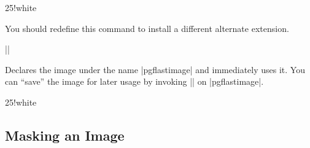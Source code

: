 \begin{command}{\pgfuseimage{}}
\begin{codeexample}[]
\begin{colormixin}{25!white}
\begin{pgfpicture}
  \pgfpathrectangle{\pgfpoint{1cm}{5cm}}{\pgfpoint{1cm}{1cm}}
  \pgfpathrectangle{\pgfpoint{1cm}{3cm}}{\pgfpoint{1cm}{1cm}}
  \pgfpathrectangle{\pgfpoint{1cm}{1cm}}{\pgfpoint{1cm}{1cm}}
\end{pgfpicture}
\end{colormixin}
\end{codeexample}
\end{command}

\begin{command}{\pgfalternateextension}
  You should redefine this command to install a different alternate
  extension.

  \example |\def\pgfalternateextension{!25!white}|
\end{command}


\begin{command}{\pgfimage{}}
  Declares the image under the name |pgflastimage| and
  immediately uses it. You can ``save'' the image for later usage by
  invoking |\pgfaliasimage| on |pgflastimage|.

\begin{codeexample}[]
\begin{colormixin}{25!white}
\begin{pgfpicture}

  \pgfpathrectangle{\pgfpoint{1cm}{5cm}}{\pgfpoint{1cm}{1cm}}
  \pgfpathrectangle{\pgfpoint{1cm}{3cm}}{\pgfpoint{1cm}{1cm}}
  \pgfpathrectangle{\pgfpoint{1cm}{1cm}}{\pgfpoint{1cm}{1cm}}
\end{pgfpicture}
\end{colormixin}
\end{codeexample}
\end{command}



\subsection{Masking an Image}


